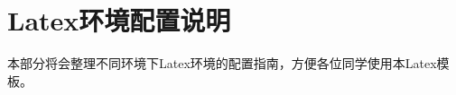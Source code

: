 \chapter{Latex环境配置说明}

\label{cha:sysu-thesis-latex-install-guide}

本部分将会整理不同环境下Latex环境的配置指南，方便各位同学使用本Latex模板。



